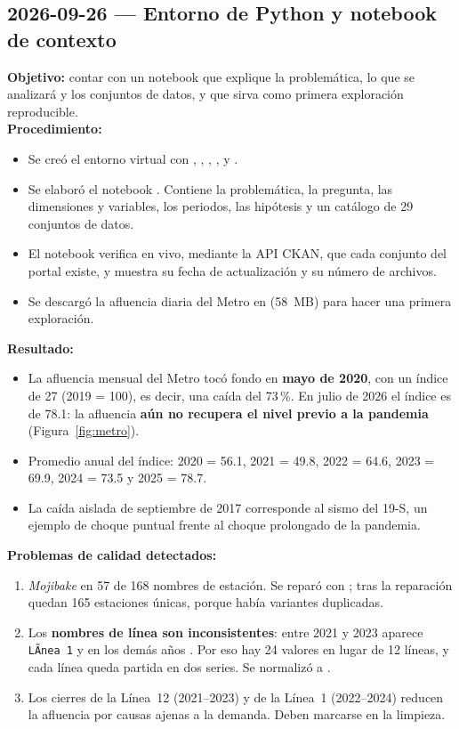 \subsection{2026-09-26 --- Entorno de Python y notebook de contexto}
\textbf{Objetivo:} contar con un notebook que explique la problemática, lo que se analizará y los
conjuntos de datos, y que sirva como primera exploración reproducible.\\
\textbf{Procedimiento:}
\begin{itemize}
  \item Se creó el entorno virtual  con , ,
        , ,  y .
  \item Se elaboró el notebook . Contiene la
        problemática, la pregunta, las dimensiones y variables, los periodos, las hipótesis y un
        catálogo de 29 conjuntos de datos.
  \item El notebook verifica en vivo, mediante la API CKAN, que cada conjunto del portal existe, y
        muestra su fecha de actualización y su número de archivos.
  \item Se descargó la afluencia diaria del Metro en  (58~MB) para hacer
        una primera exploración.
\end{itemize}
\textbf{Resultado:}
\begin{itemize}
  \item La afluencia mensual del Metro tocó fondo en \textbf{mayo de 2020}, con un índice de 27
        (2019 = 100), es decir, una caída del 73\,\%. En julio de 2026 el índice es de 78.1: la
        afluencia \textbf{aún no recupera el nivel previo a la pandemia} (Figura~\ref{fig:metro}).
  \item Promedio anual del índice: 2020 = 56.1, 2021 = 49.8, 2022 = 64.6, 2023 = 69.9,
        2024 = 73.5 y 2025 = 78.7.
  \item La caída aislada de septiembre de 2017 corresponde al sismo del 19-S, un ejemplo de choque
        puntual frente al choque prolongado de la pandemia.
\end{itemize}
\textbf{Problemas de calidad detectados:}
\begin{enumerate}
  \item \emph{Mojibake} en 57 de 168 nombres de estación. Se reparó con ; tras la
        reparación quedan 165 estaciones únicas, porque había variantes duplicadas.
  \item Los \textbf{nombres de línea son inconsistentes}: entre 2021 y 2023 aparece
        \texttt{LÃnea 1} y en los demás años . Por eso hay 24 valores en lugar
        de 12 líneas, y cada línea queda partida en dos series. Se normalizó a .
  \item Los cierres de la Línea~12 (2021--2023) y de la Línea~1 (2022--2024) reducen la afluencia
        por causas ajenas a la demanda. Deben marcarse en la limpieza.
\end{enumerate}

